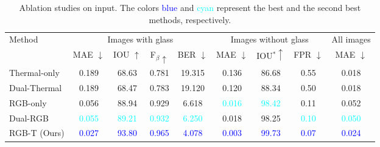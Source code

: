 \begin{table*}[ht]
\renewcommand\arraystretch{1.5}
\setlength\tabcolsep{5pt}
\centering
\caption{Ablation studies on input. The colors \textcolor{blue}{blue} and \textcolor{cyan}{cyan} represent the best and the second best methods, respectively.}
\label{tab:ab_input}             
\begin{tabular}{lcccccccc} 
\toprule
\multirow{2}{*}{Method} & \multicolumn{4}{c}{Images with glass} & \multicolumn{3}{c}{Images without glass} & All images        \\ 
\cmidrule[0.25pt](lr){2-5} \cmidrule[0.25pt](lr){6-8} \cmidrule[0.25pt](lr){9-9} 
& MAE $\downarrow$                      & IOU $\uparrow$                        & F$_\beta\uparrow$                     & BER $\downarrow$                      & MAE $\downarrow$                      & IOU$^\ast\uparrow$                    & FPR $\downarrow$                     & MAE $\downarrow$  \\ 
\midrule
     
Thermal-only & 0.189 & 68.63 & 0.781 & 19.315 & 0.136 & 86.68 & 0.55 & 0.018\\ 
Dual-Thermal & 0.189 & 68.47 & 0.783 & 19.120 & 0.120 & 88.34 & 0.50 & 0.018\\ 
RGB-only & \multicolumn{1}{c}{0.056} & \multicolumn{1}{c}{88.94} & \multicolumn{1}{c}{0.929} & 6.618 & \multicolumn{1}{c}{\textcolor{cyan}{0.016}} & \multicolumn{1}{c}{\textcolor{cyan}{98.42}} & 0.11 & 0.052\\ 
Dual-RGB & \multicolumn{1}{c}{\textcolor{cyan}{0.055}} & \multicolumn{1}{c}{\textcolor{cyan}{89.21}} & \multicolumn{1}{c}{\textcolor{cyan}{0.932}} & \textcolor{cyan}{6.250} & \multicolumn{1}{c}{0.018} & \multicolumn{1}{c}{98.25} & \textcolor{cyan}{0.10} & \textcolor{cyan}{0.050}\\ \hline

RGB-T (Ours) & \multicolumn{1}{c}{\textcolor{blue}{0.027}} & \multicolumn{1}{c}{\textcolor{blue}{93.80}} & \multicolumn{1}{c}{\textcolor{blue}{0.965}} & \textcolor{blue}{4.078} & \multicolumn{1}{c}{\textcolor{blue}{0.003}} & \multicolumn{1}{c}{\textcolor{blue}{99.73}} & \textcolor{blue}{0.07} & \textcolor{blue}{0.024}\\ 
\bottomrule
\end{tabular}
\end{table*}




